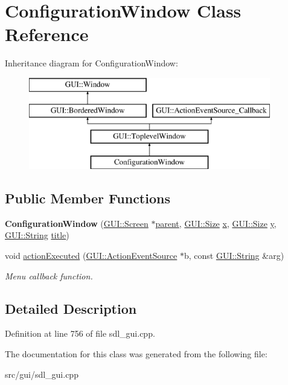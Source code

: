 \hypertarget{classConfigurationWindow}{\section{Configuration\-Window Class Reference}
\label{classConfigurationWindow}
}
Inheritance diagram for Configuration\-Window\-:\begin{figure}[H]
\begin{center}
\leavevmode
\includegraphics[height=4.000000cm]{classConfigurationWindow}
\end{center}
\end{figure}
\subsection*{Public Member Functions}
\begin{DoxyCompactItemize}
\item 
\hypertarget{classConfigurationWindow_aa024579e615b177a61410dc04b70d124}{{\bfseries Configuration\-Window} (\hyperlink{classGUI_1_1Screen}{G\-U\-I\-::\-Screen} $\ast$\hyperlink{classGUI_1_1Window_a2e593ff65e7702178d82fe9010a0b539}{parent}, \hyperlink{namespaceGUI_a10b6232e08729baa0bd211a86a69ce36}{G\-U\-I\-::\-Size} \hyperlink{classGUI_1_1Window_a6ca6a80ca00c9e1d8ceea8d3d99a657d}{x}, \hyperlink{namespaceGUI_a10b6232e08729baa0bd211a86a69ce36}{G\-U\-I\-::\-Size} \hyperlink{classGUI_1_1Window_a0ee8e923aff2c3661fc2e17656d37adf}{y}, \hyperlink{classGUI_1_1String}{G\-U\-I\-::\-String} \hyperlink{classGUI_1_1ToplevelWindow_a04de191f9a57b5b584657866a4ac6843}{title})}\label{classConfigurationWindow_aa024579e615b177a61410dc04b70d124}

\item 
\hypertarget{classConfigurationWindow_a2dac96be9ab39e51f0eabec372406664}{void \hyperlink{classConfigurationWindow_a2dac96be9ab39e51f0eabec372406664}{action\-Executed} (\hyperlink{classGUI_1_1ActionEventSource}{G\-U\-I\-::\-Action\-Event\-Source} $\ast$b, const \hyperlink{classGUI_1_1String}{G\-U\-I\-::\-String} \&arg)}\label{classConfigurationWindow_a2dac96be9ab39e51f0eabec372406664}

\begin{DoxyCompactList}\small\item\em Menu callback function. \end{DoxyCompactList}\end{DoxyCompactItemize}


\subsection{Detailed Description}


Definition at line 756 of file sdl\-\_\-gui.\-cpp.



The documentation for this class was generated from the following file\-:\begin{DoxyCompactItemize}
\item 
src/gui/sdl\-\_\-gui.\-cpp\end{DoxyCompactItemize}
